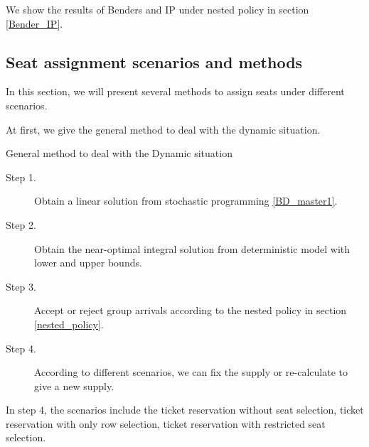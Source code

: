 

We show the results of Benders and IP under nested policy in section \ref{Bender_IP}.


\subsection{Seat assignment scenarios and methods}
In this section, we will present several methods to assign seats under different scenarios.

At first, we give the general method to deal with the dynamic situation.

\begin{algorithm}[H]\label{general_method}
  \caption{General method to deal with the Dynamic situation}
  \begin{description}
    \item[Step 1.] Obtain a linear solution from stochastic programming \eqref{BD_master1}.
    \item[Step 2.] Obtain the near-optimal integral solution from deterministic model with lower and upper bounds.
    \item[Step 3.] Accept or reject group arrivals according to the nested policy in section \ref{nested_policy}.
    \item[Step 4.] According to different scenarios, we can fix the supply or re-calculate to give a new supply. 
  \end{description}
\end{algorithm}

In step 4, the scenarios include the ticket reservation without seat selection, ticket reservation with only row selection, ticket reservation with restricted seat selection. 


